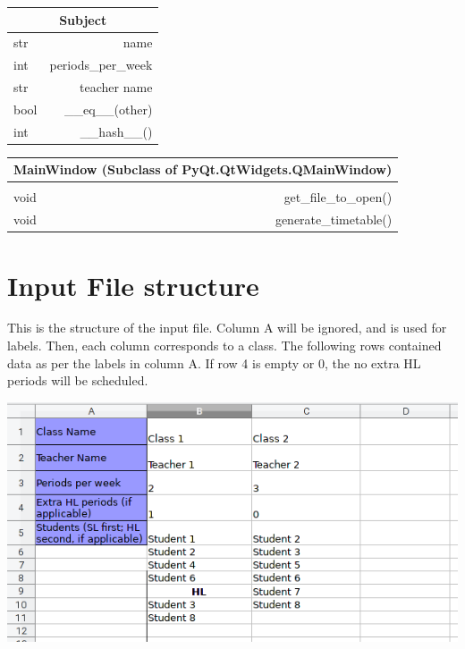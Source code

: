 \documentclass[12pt]{article}
\begin{document}
%
\begin{table}[H]
    \centering
\begin{tabular}{|l r|}
    \hline
    \multicolumn{2}{|c|}{Subject}\\
    \hline
    \hline
    str & name\\
    int & periods\_per\_week\\
    str & teacher name\\
    \hline
    bool & \_\_eq\_\_(other)\\
    int  & \_\_hash\_\_()\\
    \hline
\end{tabular}
\end{table}
%


%
\begin{table}[H]
    \centering
\begin{tabular}{|l r|}
    \hline
    \multicolumn{2}{|c|}{MainWindow (Subclass of PyQt.QtWidgets.QMainWindow)}\\
    \hline
    \hline              
    & \\[-0.5em]
    \hline
    void & get\_file\_to\_open()\\
    void & generate\_timetable()\\
    \hline
\end{tabular}
\end{table}
%


\section{Input File structure}
This is the structure of the input file. Column A will be ignored, and is used for labels.
Then, each column corresponds to a class. The following rows contained data as per the
labels in column A. If row 4 is empty or 0, the no extra HL periods will be scheduled. 

\includegraphics[width=\textwidth]{data_file_structure.png}
\end{document}
